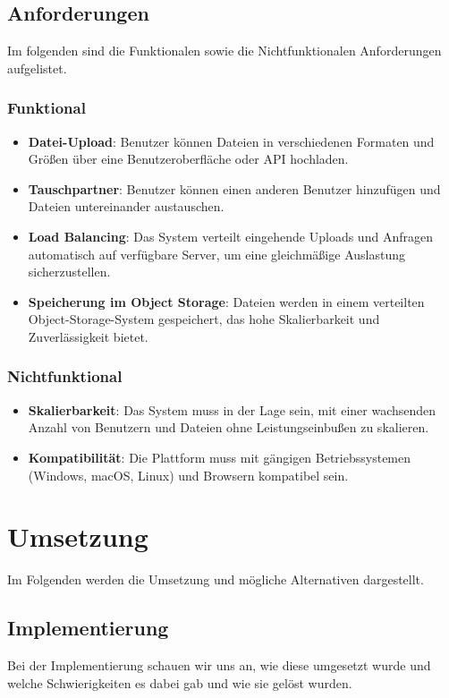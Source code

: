 \documentclass[12pt]{report}
\begin{document}
	\section{Anforderungen}
		Im folgenden sind die Funktionalen sowie die Nichtfunktionalen Anforderungen aufgelistet.
		\subsection{Funktional}
			\begin{itemize}
				\item \textbf{Datei-Upload}: Benutzer können Dateien in verschiedenen Formaten und Größen über eine Benutzeroberfläche oder API hochladen.
				\item \textbf{Tauschpartner}: Benutzer können einen anderen Benutzer hinzufügen und Dateien untereinander austauschen.
				\item \textbf{Load Balancing}: Das System verteilt eingehende Uploads und Anfragen automatisch auf verfügbare Server, um eine gleichmäßige Auslastung sicherzustellen.
				\item \textbf{Speicherung im Object Storage}: Dateien werden in einem verteilten Object-Storage-System gespeichert, das hohe Skalierbarkeit und Zuverlässigkeit bietet.
			\end{itemize}
		\subsection{Nichtfunktional}
			\begin{itemize}
				\item \textbf{Skalierbarkeit}: Das System muss in der Lage sein, mit einer wachsenden Anzahl von Benutzern und Dateien ohne Leistungseinbußen zu skalieren.
				\item \textbf{Kompatibilität}: Die Plattform muss mit gängigen Betriebssystemen (Windows, macOS, Linux) und Browsern kompatibel sein.
			\end{itemize}

\chapter{Umsetzung}
	Im Folgenden werden die Umsetzung und mögliche Alternativen dargestellt.
	\section{Implementierung}
		Bei der Implementierung schauen wir uns an, wie diese umgesetzt wurde und welche Schwierigkeiten es dabei gab und wie sie gelöst wurden.
\end{document}
